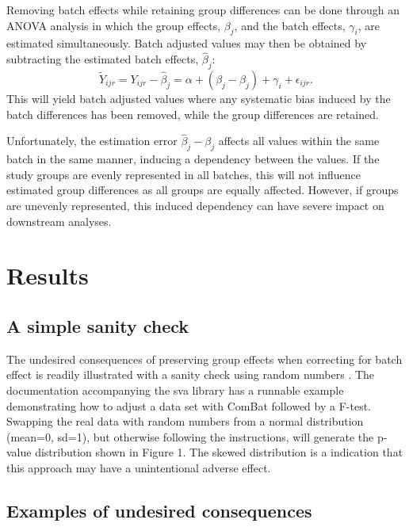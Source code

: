 \documentclass{bio}
\begin{document}
Removing batch effects while retaining group differences can be done through an ANOVA analysis in which the group effects, $\beta_j$, and the batch effects, $\gamma_i$, are estimated simultaneously. Batch adjusted values may then be obtained by subtracting the estimated batch effects, $\hat\beta_j$:
\begin{equation}
\widetilde Y_{ijr}=Y_{ijr}-\hat\beta_j=\alpha+(\beta_j-\hat\beta_j)+\gamma_i+\epsilon_{ijr}.
\end{equation}
This will yield batch adjusted values where any systematic bias induced by the batch differences has been removed, while the group differences are retained.

Unfortunately, the estimation error $\hat\beta_j-\beta_j$ affects all values within the same batch in the same manner, inducing a dependency between the values. If the study groups are evenly represented in all batches, this will not influence estimated group differences as all groups are equally affected. However, if groups are unevenly represented, this induced dependency can have severe impact on downstream analyses.


\section{Results}

\subsection{A simple sanity check}

The undesired consequences of preserving group effects when correcting for batch effect is readily illustrated with a sanity check using random numbers . The documentation accompanying the sva library has a runnable example demonstrating how to adjust a data set with ComBat followed by a F-test. Swapping the real data with random numbers from a normal distribution (mean=0, sd=1), but otherwise following the instructions, will generate the p-value distribution shown in Figure 1. The skewed distribution is a indication that this approach may have a unintentional adverse effect. 



\subsection{Examples of undesired consequences}
\end{document}
